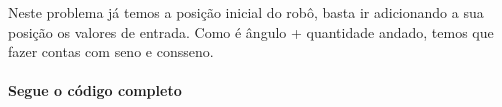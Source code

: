 \par Neste problema já temos a posição inicial do robô, basta ir adicionando a sua posição os valores de entrada. Como é ângulo + quantidade andado, temos que fazer contas com seno e consseno.
\paragraph{Segue o código completo}
\begin{mdframed}[linewidth=0pt,backgroundcolor=codebgcolor]
    \inputminted[breaklines]{python}{../src/vacuumba/vacuumba.py}
\end{mdframed}